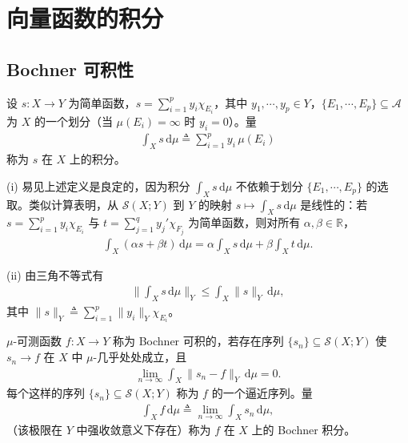 \documentclass[../../main.tex]{subfiles}%
\begin{document}
\section{向量函数的积分}\label{section:ch04-积分}

\subsection{Bochner 可积性}\label{subsection:ch04-Bochner可积}

\begin{definition}[简单函数的积分]\label{definition:ch04-简单函数积分}
设 $s:X\to Y$ 为简单函数，$s=\sum_{i=1}^p y_i\chi_{E_i}$，其中 $y_1,\cdots ,y_p\in Y$，$\{E_1,\cdots ,E_p\}\subseteq\mathcal{A}$ 为 $X$ 的一个划分（当 $\mu(E_i)=\infty$ 时 $y_i=0$）。量
\begin{align*}
\int_X s\,\mathrm{d}\mu\triangleq \sum_{i=1}^p y_i\,\mu(E_i)
\end{align*}
称为 $s$ 在 $X$ 上的积分。
\end{definition}

\begin{remark}\label{remark:ch04-简单积分性质}
(i) 易见上述定义是良定的，因为积分 $\int_X s\,\mathrm{d}\mu$ 不依赖于划分 $\{E_1,\cdots ,E_p\}$ 的选取。类似计算表明，从 $\mathcal{S}(X;Y)$ 到 $Y$ 的映射 $s\mapsto\int_X s\,\mathrm{d}\mu$ 是线性的：若 $s=\sum_{i=1}^p y_i\chi_{E_i}$ 与 $t=\sum_{j=1}^q y_j'\chi_{F_j}$ 为简单函数，则对所有 $\alpha,\beta\in\mathbb{R}$，
\begin{align}
\int_X(\alpha s+\beta t)\,\mathrm{d}\mu=\alpha\int_X s\,\mathrm{d}\mu+\beta\int_X t\,\mathrm{d}\mu. \label{align:ch04-4.30}
\end{align}

(ii) 由三角不等式有
\begin{align}
\Big\|\int_X s\,\mathrm{d}\mu\Big\|_Y\leqslant\int_X\|s\|_Y\,\mathrm{d}\mu, \label{align:ch04-4.31}
\end{align}
其中 $\|s\|_Y\triangleq \sum_{i=1}^p\|y_i\|_Y\chi_{E_i}$。
\end{remark}

\begin{definition}\label{definition:ch04-Bochner可积}
$\mu$-可测函数 $f:X\to Y$ 称为 Bochner 可积的，若存在序列 $\{s_n\}\subseteq\mathcal{S}(X;Y)$ 使 $s_n\to f$ 在 $X$ 中 $\mu$-几乎处处成立，且
\begin{align}
\lim_{n\to\infty}\int_X\|s_n-f\|_Y\,\mathrm{d}\mu=0. \label{align:ch04-4.32}
\end{align}
每个这样的序列 $\{s_n\}\subseteq\mathcal{S}(X;Y)$ 称为 $f$ 的一个逼近序列。量
\begin{align}
\int_X f\,\mathrm{d}\mu\triangleq \lim_{n\to\infty}\int_X s_n\,\mathrm{d}\mu, \label{align:ch04-4.33}
\end{align}
（该极限在 $Y$ 中强收敛意义下存在）称为 $f$ 在 $X$ 上的 Bochner 积分。
\end{definition}
\end{document}
